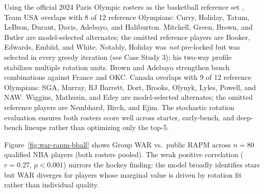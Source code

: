 \documentclass[11pt,letterpaper]{article}
\begin{document}
Using the official 2024 Paris Olympic rosters as the basketball
reference set \citep{fibaParisRosterTracker,usaBasketball2024,teamCanada2024MBB},
Team USA overlaps with 8 of 12 reference Olympians:
Curry, Holiday, Tatum, LeBron,
Durant, Davis, Adebayo, and Haliburton. Mitchell, Green, Brown, and
Butler are model-selected alternates; the omitted reference players are
Booker, Edwards, Embiid, and White. Notably, Holiday was \emph{not}
pre-locked but was selected in every greedy iteration (see Case Study
3); his two-way profile stabilizes multiple rotation units. Brown and
Adebayo strengthen bench combinations against France and OKC.
Canada overlaps with 9 of 12 reference Olympians: SGA, Murray, RJ
Barrett, Dort, Brooks, Olynyk, Lyles, Powell, and NAW. Wiggins,
Mathurin, and Edey are model-selected alternates; the omitted reference
players are Nembhard, Birch, and Ejim. The stochastic rotation
evaluation ensures both rosters score well across starter, early-bench,
and deep-bench lineups rather than optimizing only the top-5.

Figure~\ref{fig:war-rapm-bball} shows Group WAR vs.\ public RAPM
across $n = 80$ qualified NBA players (both rosters pooled). The
weak positive correlation ($r = 0.27$, $p < 0.001$) mirrors the
hockey finding: the model broadly identifies stars but WAR diverges
for players whose marginal value is driven by rotation fit rather than
individual quality.
\end{document}
